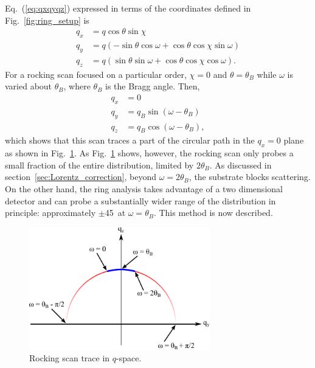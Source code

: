 Eq.~(\ref{eq:qxqyqz}) expressed in terms of the coordinates defined in 
Fig.~\ref{fig:ring_setup} is
\begin{align}
  q_x &= q\cos\theta\sin\chi \nonumber\\
  q_y &= q\left(-\sin\theta\cos\omega + \cos\theta\cos\chi\sin\omega\right) \nonumber\\
  q_z &= q\left(\sin\theta\sin\omega + \cos\theta\cos\chi\cos\omega\right).
  \label{eq:ccd2q}
\end{align}
For a rocking scan focused on a particular order, 
$\chi=0$ and $\theta=\theta_B$ while $\omega$ is varied about $\theta_B$, 
where $\theta_B$ is the Bragg angle. Then, 
\begin{align}
  q_x &= 0 \nonumber\\
  q_y &= q_B\sin(\omega-\theta_B) \nonumber\\
  q_z &= q_B\cos(\omega-\theta_B),
  \label{eq:rock} 
\end{align}
which shows that this scan traces a part of the circular path in the $q_x=0$ plane
as shown in Fig.~\ref{fig:rock}. As Fig.~\ref{fig:rock} shows, however, the 
rocking scan only probes a small fraction of the entire distribution, limited
by $2\theta_B$. As discussed in section~\ref{sec:Lorentz_correction}, beyond
$\omega=2\theta_B$, the substrate blocks scattering. On the other hand,
the ring analysis takes advantage of a two dimensional detector and can probe
a substantially wider range of the distribution in principle: approximately $\pm$45\textdegree\
at $\omega=\theta_B$. This method is now described.

\begin{figure}
  \centering
  \includegraphics[width=0.7\textwidth]{figures/ripple/mosaic/rock}
  \caption{Rocking scan trace in $q$-space.}
  \label{fig:rock}
\end{figure}

